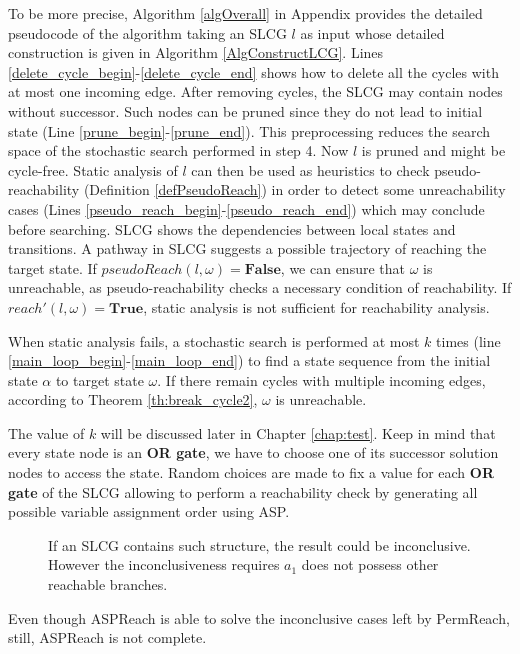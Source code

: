 To be more precise, Algorithm \ref{algOverall} in Appendix provides the detailed pseudocode of the algorithm taking an SLCG $l$ as input whose detailed construction is given in Algorithm \ref{AlgConstructLCG}.
Lines \ref{delete_cycle_begin}-\ref{delete_cycle_end} shows how to delete all the cycles with at most one incoming edge.
After removing cycles, the SLCG may contain nodes without successor.
Such nodes can be pruned since they do not lead to initial state (Line \ref{prune_begin}-\ref{prune_end}).
This preprocessing reduces the search space of the stochastic search performed in step 4.
Now $l$ is pruned and might be cycle-free.
Static analysis of $l$ can then be used as heuristics to check pseudo-reachability (Definition \ref{defPseudoReach}) in order to detect some unreachability cases (Lines \ref{pseudo_reach_begin}-\ref{pseudo_reach_end}) which may conclude before searching.
SLCG shows the dependencies between local states and transitions. 
A pathway in SLCG suggests a possible trajectory of reaching the target state. 
If $pseudoReach(l,\omega)=\textbf{False}$, we can ensure that $\omega$ is unreachable, as pseudo-reachability checks a necessary condition of reachability.
If $reach'(l,\omega)=\textbf{True}$, static analysis is not sufficient for reachability analysis. 

When static analysis fails, a stochastic search is performed at most $k$ times (line \ref{main_loop_begin}-\ref{main_loop_end}) to find a state sequence from the initial state $\alpha$ to target state $\omega$.
If there remain cycles with multiple incoming edges, according to Theorem \ref{th:break_cycle2}, $\omega$ is unreachable.

The value of $k$ will be discussed later in Chapter \ref{chap:test}.
Keep in mind that every state node is an \textbf{OR gate}, we have to choose one of its successor solution nodes to access the state. 
Random choices are made to fix a value for each \textbf{OR gate} of the SLCG allowing to perform a reachability check by generating all possible variable assignment order using ASP.




\begin{figure}[ht]
    \centering
    
    \caption[Counterexample of ASPReach]{If an SLCG contains such structure, the result could be inconclusive.
    However the inconclusiveness requires $a_1$ does not possess other reachable branches.}
    \label{fig:lcgInconc}
\end{figure}
Even though ASPReach is able to solve the inconclusive cases left by PermReach, still, ASPReach is not complete.

